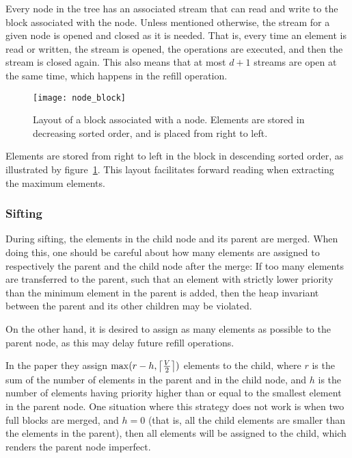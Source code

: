 Every node in the tree has an associated stream that can read and
write to the block associated with the node. Unless mentioned otherwise,
the stream for a given node is opened and
closed as it is needed. That is, every time an element is read
or written, the stream is opened, the operations are executed,
and then the stream is closed again. This also means that at
most $d + 1$ streams are open at the same time, which happens in
the refill operation.

\begin{figure}
  \centering
  \texttt{[image: node\_block]}
  \caption{Layout of a block associated with a node. Elements are
    stored in decreasing sorted order, and is placed from right to left.}
  \label{fig:node-block}
\end{figure}

Elements are stored from right to left in the block in
descending sorted order, as illustrated by
figure~\ref{fig:node-block}. This layout facilitates forward reading
when extracting the maximum elements.

\subsubsection{Sifting}
\label{sec:heap:sifting}
During sifting, the elements in the child node and its parent are merged.
When doing this, one should be careful
about how many elements are assigned to respectively the parent and
the child node after the merge: If too many elements are transferred
to the parent, such that an element with strictly lower priority than the minimum element in the parent is
added, then the heap invariant between the parent and
its other children may be violated.

On the other hand, it is desired to assign as many elements as
possible to the parent node, as this may delay future refill
operations.

In the paper they assign $\max(r - h, \ceil*{\frac{V}{2}})$ elements to
the child, where $r$ is the sum of the number of elements in the
parent and in the child node, and $h$ is the number of elements
having priority higher than or equal to the smallest element in the parent node.
One situation where this strategy does not work is when two full blocks are merged, and $h =
0$ (that is, all the child elements are smaller than the elements in the parent),
then all elements will be assigned to the child, which renders the
parent node imperfect.

